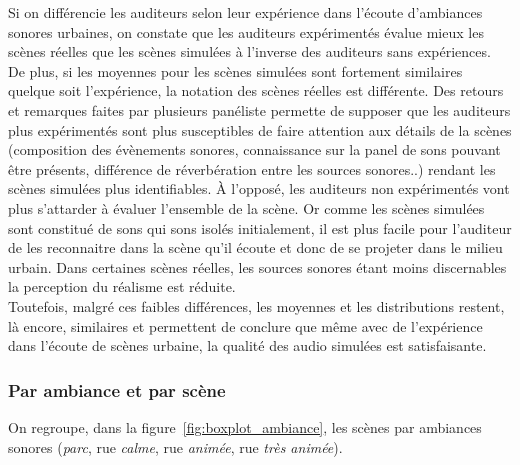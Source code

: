 Si on différencie les auditeurs selon leur expérience dans l'écoute d'ambiances sonores urbaines, on constate que les auditeurs expérimentés évalue mieux les scènes réelles que les scènes simulées à l'inverse des auditeurs sans expériences. De plus, si les moyennes pour les scènes simulées sont fortement similaires quelque soit l'expérience, la notation des scènes réelles est différente. Des retours et remarques faites par plusieurs panéliste permette de supposer que les auditeurs plus expérimentés sont plus susceptibles de faire attention aux détails de la scènes (composition des évènements sonores, connaissance sur la panel de sons pouvant être présents, différence de réverbération entre les sources sonores..) rendant les scènes simulées plus identifiables. À l'opposé, les auditeurs non expérimentés vont plus s'attarder à évaluer l'ensemble de la scène. Or comme les scènes simulées sont constitué de sons qui sons isolés initialement, il est plus facile pour l'auditeur de les reconnaitre dans la scène qu'il écoute et donc de se \og  projeter \fg{} dans le milieu urbain. Dans certaines scènes réelles, les sources sonores étant moins discernables la perception du réalisme est réduite.\\

Toutefois, malgré ces faibles différences, les moyennes et les distributions restent, là encore, similaires et permettent de conclure que même avec de l'expérience dans l'écoute de scènes urbaine, la qualité des audio simulées est satisfaisante.\\

\subsubsection{Par ambiance et par scène}

On regroupe, dans la figure~\ref{fig:boxplot_ambiance}, les scènes par ambiances sonores (\textit{parc}, rue \textit{calme}, rue \textit{animée}, rue \textit{très animée}).\\

